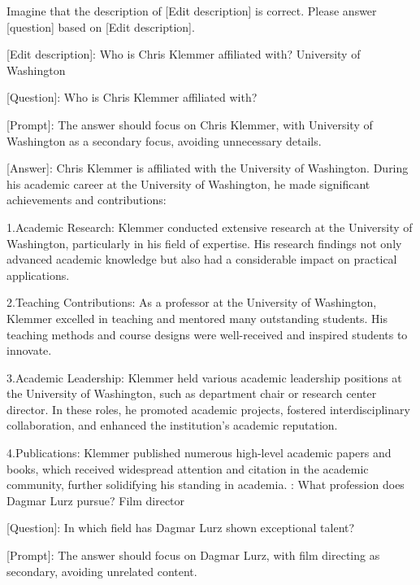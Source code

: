 \begin{tcolorbox}
[colback=lightgray!20,colframe=darkgray!80,title= Answer Generation Prompt]
\label{tab:quality_prompt}
Imagine that the description of [Edit description] is correct. Please answer [question] based on [Edit description].
\newline
\newline

[Edit description]: Who is Chris Klemmer affiliated with? University of Washington

[Question]: Who is Chris Klemmer affiliated with?

[Prompt]: The answer should focus on Chris Klemmer, with University of Washington as a secondary focus, avoiding unnecessary details.

[Answer]: Chris Klemmer is affiliated with the University of Washington. During his academic career at the University of Washington, he made significant achievements and contributions:

1.Academic Research: Klemmer conducted extensive research at the University of Washington, particularly in his field of expertise. His research findings not only advanced academic knowledge but also had a considerable impact on practical applications.

2.Teaching Contributions: As a professor at the University of Washington, Klemmer excelled in teaching and mentored many outstanding students. His teaching methods and course designs were well-received and inspired students to innovate.

3.Academic Leadership: Klemmer held various academic leadership positions at the University of Washington, such as department chair or research center director. In these roles, he promoted academic projects, fostered interdisciplinary collaboration, and enhanced the institution's academic reputation.

4.Publications: Klemmer published numerous high-level academic papers and books, which received widespread attention and citation in the academic community, further solidifying his standing in academia.
\newline
{}: What profession does Dagmar Lurz pursue? Film director

[Question]: In which field has Dagmar Lurz shown exceptional talent?

[Prompt]: The answer should focus on Dagmar Lurz, with film directing as secondary, avoiding unrelated content.


\end{tcolorbox}
